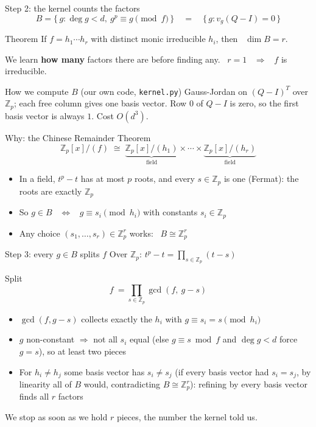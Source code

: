 \documentclass[aspectratio=169,11pt]{beamer}
\newcommand{\Zp}{\mathbb{Z}_p}
\newcommand{\Zpx}{\mathbb{Z}_p[x]}
\newcommand{\aside}[1]{{\color{muted}\small #1}}
\begin{document}
\begin{frame}{Step 2: the kernel counts the factors}
  \[ B = \{\, g : \deg g < d,\ g^p \equiv g \pmod f \,\} \quad = \quad \{\, g : v_g (Q - I) = 0 \,\} \]
  \medskip
  \begin{block}{Theorem}
    If $f = h_1 \cdots h_r$ with distinct monic irreducible $h_i$, then \ $\dim B = r$.
  \end{block}
  \medskip
  We learn \textbf{how many} factors there are before finding any. \ $r = 1$ \ $\Rightarrow$ \ $f$ is irreducible.
  \medskip
  \begin{block}{How we compute $B$ (our own code, \texttt{kernel.py})}
    Gauss-Jordan on $(Q - I)^T$ over $\Zp$; each free column gives one basis vector.
    Row $0$ of $Q - I$ is zero, so the first basis vector is always $1$. Cost $O(d^3)$.
  \end{block}
\end{frame}

\begin{frame}{Why: the Chinese Remainder Theorem}
  \[
    \Zpx/(f) \;\cong\; \underbrace{\Zpx/(h_1)}_{\text{field}} \times \cdots \times \underbrace{\Zpx/(h_r)}_{\text{field}}
  \]
  \medskip
  \begin{itemize}
    \item In a field, $t^p - t$ has at most $p$ roots, and every $s \in \Zp$ is one \aside{(Fermat)}: the roots are exactly $\Zp$
    \item So $g \in B$ \ $\iff$ \ $g \equiv s_i \pmod{h_i}$ with constants $s_i \in \Zp$
    \item Any choice $(s_1, \dots, s_r) \in \Zp^r$ works: \ $B \cong \Zp^r$
  \end{itemize}
  \bigskip
\end{frame}

\begin{frame}{Step 3: every $g \in B$ splits $f$}
  Over $\Zp$: \quad $t^p - t = \prod_{s \in \Zp} (t - s)$
  \medskip
  \begin{block}{Split}
    \[ f \ = \prod_{s \in \Zp} \gcd(f,\ g - s) \]
  \end{block}
  \medskip
  \begin{itemize}
    \item $\gcd(f, g - s)$ collects exactly the $h_i$ with $g \equiv s_i = s \pmod{h_i}$
    \item $g$ non-constant $\Rightarrow$ not all $s_i$ equal \aside{(else $g \equiv s \bmod f$ and $\deg g < d$ force $g = s$)}, so at least two pieces
    \item For $h_i \ne h_j$ some basis vector has $s_i \ne s_j$ \aside{(if every basis vector had $s_i = s_j$, by linearity all of $B$ would, contradicting $B \cong \Zp^r$)}: refining by every basis vector finds all $r$ factors
  \end{itemize}
  \aside{We stop as soon as we hold $r$ pieces, the number the kernel told us.}
\end{frame}
\end{document}
